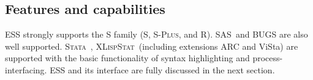 \documentclass{article}
\newcommand*{\SAS}{\textsc{SAS}}
\newcommand*{\Splus}{\textsc{S-Plus}}
\newcommand*{\XLispStat}{\textsc{XLispStat}}
\newcommand*{\Stata}{\textsc{Stata}}
\newcommand{\stexttt}[1]{{\small\texttt{#1}}}
\begin{document}





\subsection{Features and capabilities}
\label{sec:ESS:features}

ESS strongly supports the S family (S, \Splus, and R).  \SAS\ and BUGS
are also well supported.  \Stata\ , \XLispStat\ (including extensions
ARC and ViSta) are supported with the basic functionality of syntax
highlighting and process-interfacing.  ESS and its interface are fully
discussed in the next section.
\end{document}
